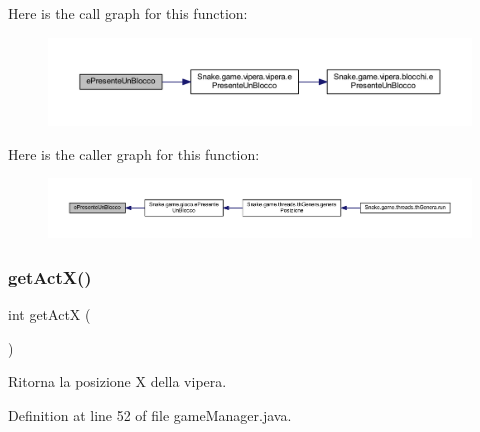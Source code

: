 Here is the call graph for this function\+:
\nopagebreak
\begin{figure}[H]
\begin{center}
\leavevmode
\includegraphics[width=350pt]{class_snake_1_1game_1_1utility_1_1game_manager_ac24833a417b3bd7c60e29ed5b7edc29f_cgraph}
\end{center}
\end{figure}
Here is the caller graph for this function\+:
\nopagebreak
\begin{figure}[H]
\begin{center}
\leavevmode
\includegraphics[width=350pt]{class_snake_1_1game_1_1utility_1_1game_manager_ac24833a417b3bd7c60e29ed5b7edc29f_icgraph}
\end{center}
\end{figure}
\mbox{\label{class_snake_1_1game_1_1utility_1_1game_manager_ae853a40673c27fff3315c5213c749814}} 
\subsubsection{\texorpdfstring{get\+Act\+X()}{getActX()}}
{\footnotesize\ttfamily int get\+ActX (\begin{DoxyParamCaption}{ }\end{DoxyParamCaption})}



Ritorna la posizione X della vipera. 



Definition at line 52 of file game\+Manager.\+java.

